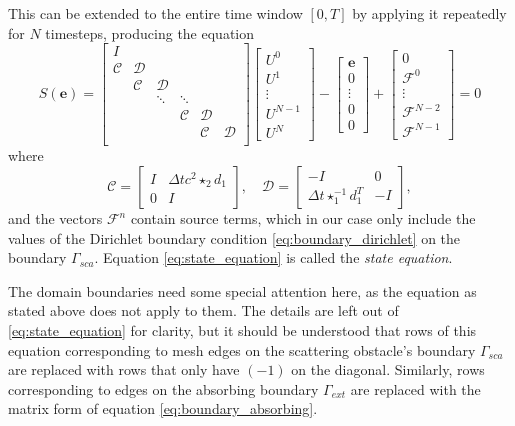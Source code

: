 \documentclass[utf8,english]{gradu3}
\begin{document}
This can be extended to the entire time window $[0,T]$
by applying it repeatedly for $N$ timesteps, producing the equation
\begin{equation}\label{eq:state_equation}
  S(\mathbf{e}) =
  \begin{bmatrix}
  I \\
  \mathcal{C} & \mathcal{D} \\
  & \mathcal{C} & \mathcal{D} \\
  & & \ddots & \ddots \\
  & & & \mathcal{C} & \mathcal{D} \\
  & & & & \mathcal{C} & \mathcal{D} \\
  \end{bmatrix}
  \begin{bmatrix}
  U^0 \\ U^1 \\ \vdots \\ U^{N-1} \\ U^N
  \end{bmatrix}
  - \begin{bmatrix}
  \mathbf{e} \\ 0 \\ \vdots \\ 0 \\ 0
  \end{bmatrix}
  + \begin{bmatrix}
  0 \\ \mathcal{F}^0 \\ \vdots \\ \mathcal{F}^{N-2} \\ \mathcal{F}^{N-1}
  \end{bmatrix}
  = 0
\end{equation}
where
\[
  \mathcal{C} = \begin{bmatrix}
  I & \Delta t c^2 \star_2 d_1 \\
  0 & I
  \end{bmatrix},
  \quad
  \mathcal{D} = \begin{bmatrix}
  -I & 0 \\
  \Delta t \star_1^{-1} d_1^T & -I
  \end{bmatrix},
\]
and the vectors $\mathcal{F}^n$ contain source terms,
which in our case only include the values of the Dirichlet boundary condition
\eqref{eq:boundary_dirichlet} on the boundary $\Gamma_{sca}$.
Equation \eqref{eq:state_equation} is called the \textit{state equation}.

The domain boundaries need some special attention here,
as the equation as stated above does not apply to them.
The details are left out of \eqref{eq:state_equation} for clarity,
but it should be understood that rows of this equation
corresponding to mesh edges on the scattering obstacle's boundary $\Gamma_{sca}$
are replaced with rows that only have $(-1)$ on the diagonal.
Similarly, rows corresponding to edges on the absorbing boundary $\Gamma_{ext}$
are replaced with the matrix form of equation \eqref{eq:boundary_absorbing}.
\end{document}
